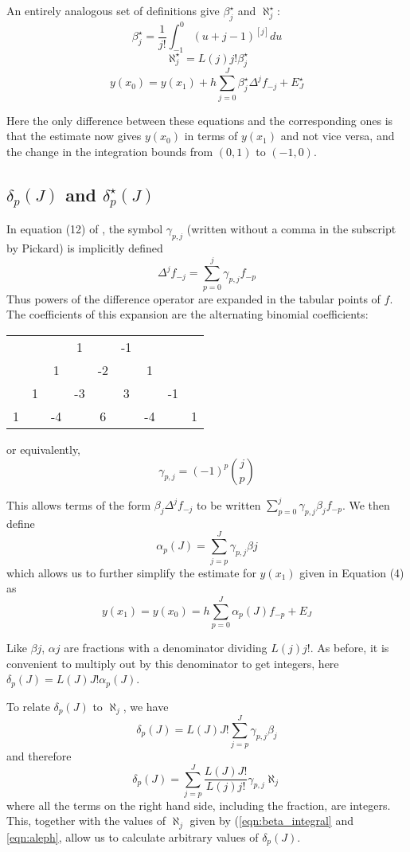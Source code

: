 \documentclass{article}
\begin{document}
An entirely analogous set of definitions give $\beta^{\star}_j$ and $\aleph^{\star}_j$:
\[ \beta^{\star}_j = \frac{1}{j!}\int_{-1}^0 (u + j - 1)^{[j]} du \]
\[ \aleph^{\star}_j = L(j)j!\beta^{\star}_j \]
\[ y(x_0) = y(x_1) + h\sum_{j=0}^{J} \beta^{\star}_j \Delta^{j}f_{-j} + E^{\star}_{J} \]

Here the only difference between these equations and the corresponding ones is that the estimate now gives $y(x_0)$ in terms of $y(x_1)$ and not vice versa, and the change in the integration bounds from $(0, 1)$ to $(-1, 0)$.

\subsection{$\delta_p(J)$ and $\delta^{\star}_p(J)$}
In equation (12) of \cite{pickard}, the symbol $\gamma_{p,j}$ (written without a comma in the subscript by Pickard) is implicitly defined
\[ \Delta^{j}f_{-j}  = \sum_{p=0}^{j} \gamma_{p,j}f_{-p} \]
Thus powers of the difference operator are expanded in the tabular points of $f$.
The coefficients of this expansion are the alternating binomial coefficients:

\begin{center}
\begin{tabular}{ccccccccc}
&&&1&&-1&&&\\
&&1&&-2&&1&&\\
&1&&-3&&3&&-1&\\
1&&-4&&6&&-4&&1\\
\end{tabular}
\end{center}
or equivalently,
\[ \gamma_{p, j} = (-1)^{p} {j \choose p} \]

This allows terms of the form $\beta_j \Delta^{j}f_{-j}$ to be written $\sum_{p=0}^{j} \gamma_{p, j} \beta_{j} f_{-p}$.
We then define 
\[ \alpha_p(J) = \sum_{j=p}^{J} \gamma_{p, j} \beta{j} \]
which allows us to further simplify the estimate for $y(x_1)$ given in Equation (4) as
\[ y(x_1) = y(x_0) = h\sum_{p=0}^{J} \alpha_{p}(J)f_{-p} + E_{J} \]

Like $\beta{j}$, $\alpha{j}$ are fractions with a denominator dividing $L(j)j!$.
As before, it is convenient to multiply out by this denominator to get integers, here $\delta_p(J) = L(J)J! \alpha_p(J)$.

To relate $\delta_p(J)$ to $\aleph_j$, we have
\[ \delta_p(J) = L(J)J! \sum_{j=p}^{J} \gamma_{p, j} \beta_{j} \]
and therefore
\[ \delta_p(J) = \sum_{j=p}^{J} \frac{L(J)J!}{L(j)j!} \gamma_{p, j} \aleph_{j} \]
where all the terms on the right hand side, including the fraction, are integers.
This, together with the values of $\aleph_{j}$ given by (\ref{eqn:beta_integral} and \ref{eqn:aleph}, allow us to calculate arbitrary values of $\delta_p(J)$.
\end{document}
